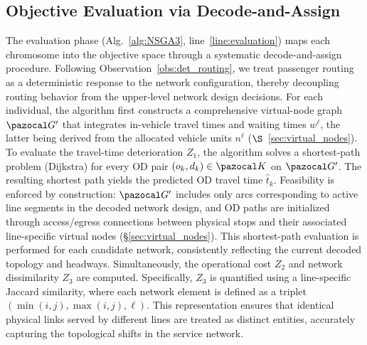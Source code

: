 \documentclass[a4paper,fleqn]{cas-sc}
\begin{document}
\subsection{Objective Evaluation via Decode-and-Assign}
\label{sec:evaluation}
The evaluation phase (Alg.~\ref{alg:NSGA3}, line~\ref{line:evaluation}) maps each chromosome into the objective space through a systematic decode-and-assign procedure. Following Observation~\ref{obs:det_routing}, we treat passenger routing as a deterministic response to the network configuration, thereby decoupling routing behavior from the upper-level network design decisions. 
%
For each individual, the algorithm first constructs a comprehensive virtual-node graph $\pazocal G'$ that integrates in-vehicle travel times and waiting times $w^\ell$, the latter being derived from the allocated vehicle units $n^\ell$ ($\S$~\ref{sec:virtual_nodes}).
%
To evaluate the travel-time deterioration $Z_1$, the algorithm solves a shortest-path problem (Dijkstra) for every OD pair $(o_k, d_k) \in \pazocal K$ on $\pazocal G'$. The resulting shortest path yields the predicted OD travel time $\hat t_k$. Feasibility is enforced by construction: $\pazocal G'$ includes only arcs corresponding to active line segments in the decoded network design, and OD paths are initialized through access/egress connections between physical stops and their associated line-specific virtual nodes (\S\ref{sec:virtual_nodes}).
%
This shortest-path evaluation is performed for each candidate network, consistently reflecting the current decoded topology and headways.
%
Simultaneously, the operational cost $Z_2$ and network dissimilarity $Z_3$ are computed. Specifically, $Z_3$ is quantified using a line-specific Jaccard similarity, where each network element is defined as a triplet $(\min(i,j), \max(i,j), \ell)$. This representation ensures that identical physical links served by different lines are treated as distinct entities, accurately capturing the topological shifts in the service network.
\end{document}
